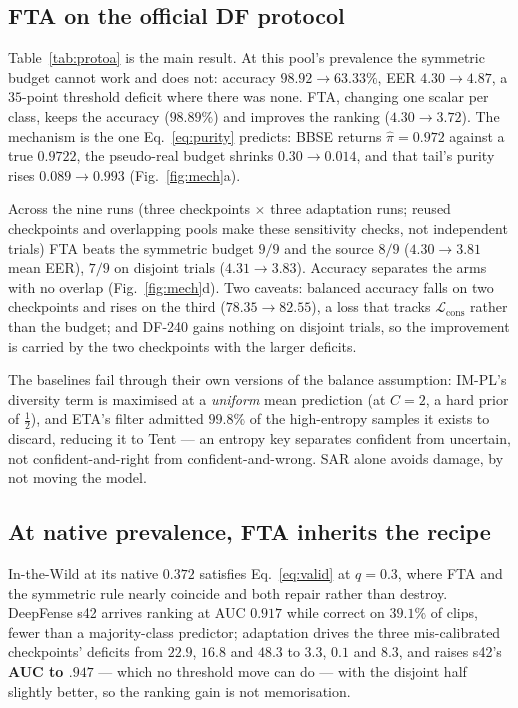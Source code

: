 \documentclass[10pt,letterpaper]{article}
\begin{document}
\subsection{FTA on the official DF protocol}
Table~\ref{tab:protoa} is the main result. At this pool's prevalence the symmetric budget cannot work and does not:
accuracy $98.92\!\to\!63.33\%$, EER $4.30\!\to\!4.87$, a $35$-point threshold
deficit where there was none. FTA, changing one scalar per class, keeps the
accuracy ($98.89\%$) and improves the ranking ($4.30\!\to\!3.72$). The mechanism is the one Eq.~\eqref{eq:purity} predicts:
BBSE returns $\hat\pi{=}0.972$ against a true $0.9722$, the pseudo-real budget
shrinks $0.30\!\to\!0.014$, and that tail's purity rises $0.089\!\to\!0.993$
(Fig.~\ref{fig:mech}a).

Across the nine runs (three checkpoints $\times$ three adaptation runs; reused
checkpoints and overlapping pools make these sensitivity checks, not independent
trials) FTA beats the symmetric budget $9/9$ and the source $8/9$
($4.30\!\to\!3.81$ mean EER), $7/9$ on disjoint trials ($4.31\!\to\!3.83$). Accuracy separates the arms with no
overlap (Fig.~\ref{fig:mech}d). Two caveats: balanced accuracy falls on two
checkpoints and rises on the third ($78.35\!\to\!82.55$), a loss that tracks
$\mathcal L_{\mathrm{cons}}$ rather than the budget; and DF-240 gains nothing on
disjoint trials, so the improvement is carried by the two checkpoints with the
larger deficits.

The baselines fail through their own versions of the balance assumption: IM-PL's
diversity term is maximised at a \emph{uniform} mean prediction (at $C{=}2$, a
hard prior of $\tfrac12$), and ETA's filter admitted $99.8\%$ of the high-entropy
samples it exists to discard, reducing it to Tent --- an entropy key separates
confident from uncertain, not confident-and-right from confident-and-wrong. SAR
alone avoids damage, by not moving the model.

\subsection{At native prevalence, FTA inherits the recipe}
In-the-Wild at its native $0.372$ satisfies Eq.~\eqref{eq:valid} at $q{=}0.3$,
where FTA and the symmetric rule nearly coincide and both repair rather than
destroy. DeepFense s42 arrives ranking at AUC $0.917$ while correct on $39.1\%$
of clips, fewer than a majority-class predictor; adaptation drives the three
mis-calibrated checkpoints' deficits from $22.9$, $16.8$ and $48.3$ to $3.3$,
$0.1$ and $8.3$, and raises s42's \textbf{AUC to $.947$} --- which no threshold
move can do --- with the disjoint half slightly better, so the ranking gain is
not memorisation.
\end{document}
